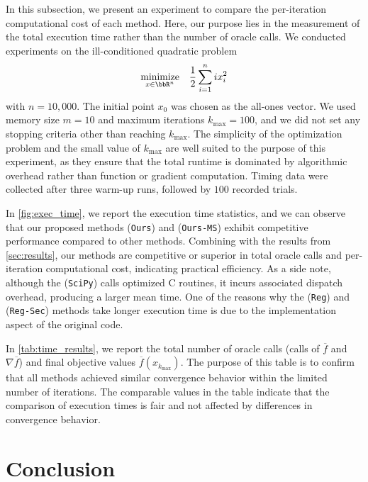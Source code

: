 \documentclass[journal]{subfiles}
\begin{document}
In this subsection, we present an experiment to compare the per-iteration computational cost of each method. Here, our purpose lies in the measurement of the total execution time rather than the number of oracle calls.
We conducted experiments on the ill-conditioned quadratic problem
\begin{equation*}
    \underset{x \in \bbR^n}{\mathrm{minimize}} \quad \frac{1}{2} \sum_{i=1}^n i x_i^2
\end{equation*}
with $n=10{,}000$.
The initial point $x_0$ was chosen as the all-ones vector.
We used memory size $m=10$ and maximum iterations $k_{\max}=100$, and we did not set any stopping criteria other than reaching $k_{\max}$.
The simplicity of the optimization problem and the small value of $k_{\max}$ are well suited to the purpose of this experiment, as they ensure that the total runtime is dominated by algorithmic overhead rather than function or gradient computation.
Timing data were collected after three warm-up runs, followed by $100$ recorded trials.

In \cref{fig:exec_time}, we report the execution time statistics, and we can observe that our proposed methods (\texttt{Ours}) and (\texttt{Ours-MS}) exhibit competitive performance compared to other methods.
Combining with the results from \cref{sec:results}, our methods are competitive or superior in total oracle calls and per-iteration computational cost, indicating practical efficiency.
As a side note, although the (\texttt{SciPy}) calls optimized C routines, it incurs associated dispatch overhead, producing a larger mean time. One of the reasons why the (\texttt{Reg}) and (\texttt{Reg-Sec}) methods take longer execution time is due to the implementation aspect of the original code.

In \cref{tab:time_results}, we report the total number of oracle calls (calls of $\overline{f}$ and $\nabla \overline{f}$) and final objective values $\overline{f}(x_{k_{\max}})$.
The purpose of this table is to confirm that all methods achieved similar convergence behavior within the limited number of iterations. The comparable values in the table indicate that the comparison of execution times is fair and not affected by differences in convergence behavior.



\section{Conclusion}\label{sec:conclusion}
\end{document}
